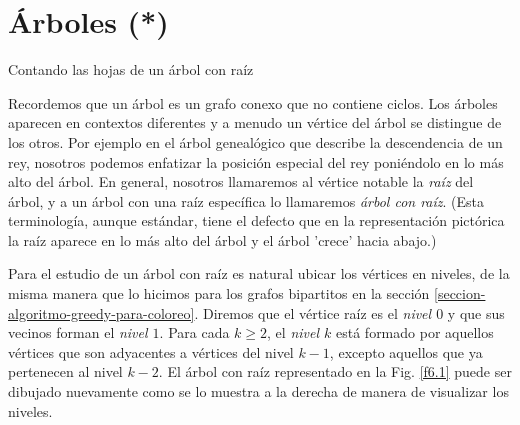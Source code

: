 \chapter[Árboles (*)]{Árboles (*)}\label{cap.arboles}

\begin{section}{Contando las hojas de un árbol con raíz}\label{seccion-arboles-con-raiz}
\label{6.1}

Recordemos que un {árbol} es un grafo conexo que no contiene ciclos. Los árboles aparecen en contextos diferentes y a menudo un vértice del árbol se distingue de los otros. Por ejemplo en el árbol genealógico que describe la descendencia de un rey, nosotros podemos enfatizar la posición especial del rey poniéndolo en lo
más alto del árbol. En general, nosotros llamaremos al vértice notable la \textit{raíz} del árbol, y a un árbol con una raíz  específica lo llamaremos \textit{árbol con raíz}. (Esta  terminología, aunque estándar, tiene el defecto que en la representación pictórica la raíz aparece en lo
más alto del árbol y el árbol 'crece' hacia abajo.)

Para el estudio de un árbol con raíz es natural ubicar los vértices en niveles, de la misma manera que lo hicimos para los grafos bipartitos en la sección \ref{seccion-algoritmo-greedy-para-coloreo}. Diremos que el vértice raíz es el \textit{nivel $0$} y que sus vecinos forman el \textit{nivel $1$}.  Para cada $k\ge 2$, el \textit{nivel $k$} está formado por aquellos vértices que son adyacentes a vértices del nivel $k-1$, excepto aquellos que ya pertenecen al nivel $k-2$. El árbol con raíz representado en la Fig. \ref{f6.1} puede ser dibujado nuevamente como se lo muestra a la derecha de manera de visualizar los niveles. 


\end{section}
